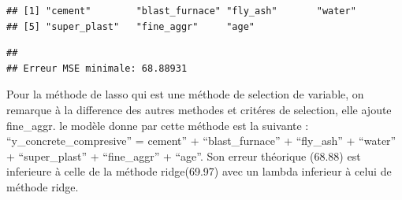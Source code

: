 \documentclass[
  12pt,
]{article}
\begin{document}
\begin{verbatim}
## [1] "cement"        "blast_furnace" "fly_ash"       "water"        
## [5] "super_plast"   "fine_aggr"     "age"
\end{verbatim}

\begin{verbatim}
## 
## Erreur MSE minimale: 68.88931
\end{verbatim}

Pour la méthode de lasso qui est une méthode de selection de variable,
on remarque à la difference des autres methodes et critéres de
selection, elle ajoute fine\_aggr. le modèle donne par cette méthode est
la suivante : ``y\_concrete\_compresive'' = cement'' +
``blast\_furnace'' + ``fly\_ash'' + ``water'' + ``super\_plast'' +
``fine\_aggr'' + ``age''. Son erreur théorique (68.88) est inferieure à
celle de la méthode ridge(69.97) avec un lambda inferieur à celui de
méthode ridge.
\end{document}
